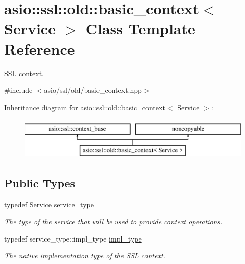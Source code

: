 \hypertarget{classasio_1_1ssl_1_1old_1_1basic__context}{}\section{asio\+:\+:ssl\+:\+:old\+:\+:basic\+\_\+context$<$ Service $>$ Class Template Reference}
\label{classasio_1_1ssl_1_1old_1_1basic__context}


S\+S\+L context.  




{\ttfamily \#include $<$asio/ssl/old/basic\+\_\+context.\+hpp$>$}

Inheritance diagram for asio\+:\+:ssl\+:\+:old\+:\+:basic\+\_\+context$<$ Service $>$\+:\begin{figure}[H]
\begin{center}
\leavevmode
\includegraphics[height=2.000000cm]{classasio_1_1ssl_1_1old_1_1basic__context}
\end{center}
\end{figure}
\subsection*{Public Types}
\begin{DoxyCompactItemize}
\item 
typedef Service \hyperlink{classasio_1_1ssl_1_1old_1_1basic__context_a8e7a844e318b8d53600febd3953b03f0}{service\+\_\+type}
\begin{DoxyCompactList}\small\item\em The type of the service that will be used to provide context operations. \end{DoxyCompactList}\item 
typedef service\+\_\+type\+::impl\+\_\+type \hyperlink{classasio_1_1ssl_1_1old_1_1basic__context_a0ab28e5a1f4db7dbf190e6bb8931031a}{impl\+\_\+type}
\begin{DoxyCompactList}\small\item\em The native implementation type of the S\+S\+L context. \end{DoxyCompactList}\end{DoxyCompactItemize}
